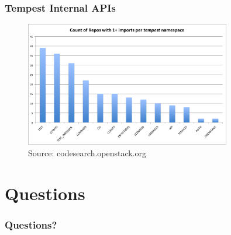 \documentclass[aspectratio=169,11pt,hyperref={colorlinks=true}]{beamer}
\begin{document}
\begin{frame}
    \frametitle{Tempest Internal APIs}
    \begin{figure}[p]
    	\centering
    	\includegraphics[width=0.8\textwidth]{tempest_import_per_namespace.png}
    	\caption{Source: codesearch.openstack.org}
    \end{figure}
\end{frame}


\section{Questions}
\begin{frame}
\frametitle{Questions?}
\end{frame}

\end{document}

